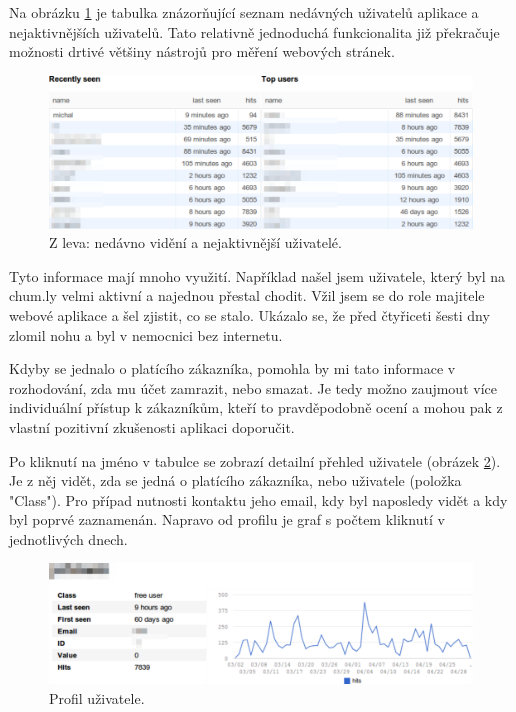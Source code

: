 \documentclass[bc,male,java,dept456]{diploma}						%
\begin{document}
Na obrázku \ref{img:users_table} je tabulka znázorňující seznam nedávných uživatelů aplikace a nejaktivnějších uživatelů. Tato relativně jednoduchá funkcionalita již překračuje možnosti drtivé většiny nástrojů pro měření webových stránek. 


\begin{figure}[h]
	\centering
	\includegraphics[width=15cm]{img/users_table.pdf}
	\caption{Z leva: nedávno vidění a nejaktivnější uživatelé.}
	\label{img:users_table}
\end{figure}

Tyto informace mají mnoho využití. Například našel jsem uživatele, který byl na chum.ly velmi aktivní a najednou přestal chodit. Vžil jsem se do role majitele webové aplikace a šel zjistit, co se stalo. Ukázalo se, že před čtyřiceti šesti dny zlomil nohu a byl v nemocnici bez internetu. 

Kdyby se jednalo o platícího zákazníka, pomohla by mi tato informace v rozhodování, zda mu účet zamrazit, nebo smazat. Je tedy možno zaujmout více individuální přístup k zákazníkům, kteří to pravděpodobně ocení a mohou pak z vlastní pozitivní zkušenosti aplikaci doporučit.

Po kliknutí na jméno v tabulce se zobrazí detailní přehled uživatele (obrázek \ref{img:user_profile}). Je z něj vidět, zda se jedná o platícího zákazníka, nebo uživatele (položka "Class"). Pro případ nutnosti kontaktu jeho email, kdy byl naposledy vidět a kdy byl poprvé zaznamenán. Napravo od profilu je graf s počtem kliknutí v jednotlivých dnech.

\begin{figure}[h]
	\centering
	\includegraphics[width=15cm]{img/user_profile.pdf}
	\caption{Profil uživatele.}
	\label{img:user_profile}
\end{figure}
\end{document}
